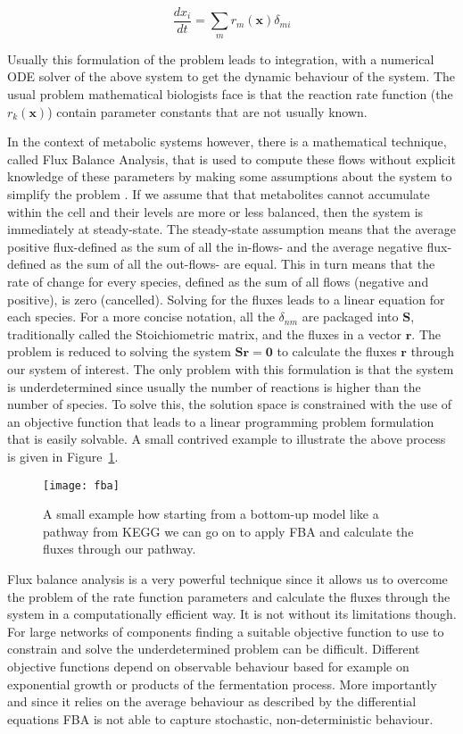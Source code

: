 \begin{equation*}
\frac{dx_i}{dt} = \sum_{m} r_m(\mathbf{x})\delta_{mi}
\end{equation*}

Usually this formulation of the problem leads to integration, with a
numerical ODE solver of the above system to get the dynamic behaviour
of the system. The usual problem mathematical biologists face is that
the reaction rate function (the $r_k(\mathbf{x})$) contain parameter
constants that are not usually known.

In the context of metabolic systems however, there is a mathematical technique, called Flux Balance
Analysis, that is used to compute these flows without explicit
knowledge of these parameters by making some assumptions about the
system to simplify the problem \cite [] {orth2010flux}. If we assume that that metabolites
cannot accumulate within the cell and their levels are more or less
balanced, then the system is immediately at steady-state. The steady-state assumption means that the average positive flux-defined as the sum of
all the in-flows- and the average negative flux-defined as the sum of
all the out-flows- are equal. This in turn means that the rate of
change for every species, defined as the sum of all flows (negative and
positive), is zero (cancelled). Solving for the fluxes leads to a linear equation for each
species. For a more concise notation, all the $\delta_{nm}$ are
packaged into $\mathbf{S}$, traditionally called the Stoichiometric
matrix, and the fluxes in a vector $\mathbf{r}$. The problem
is reduced to solving the system $\mathbf{Sr} = \mathbf{0}$ to calculate the
fluxes $\mathbf{r}$ through our system of interest. The only problem
with this formulation is that the system is
underdetermined since usually the number of reactions is higher than
the number of species. To solve this, the solution space is constrained
with the use of an objective function that leads to a linear
programming problem formulation that is easily solvable. A small
contrived example to illustrate the above process is given in
Figure~\ref{fig:fba}.

\begin{figure}[htbp!]
\centering
\texttt{[image: fba]}
\caption[Flux Balance analysis]{A small example how starting from a
  bottom-up model like a pathway from KEGG we can go on to apply FBA
  and calculate the fluxes through our pathway.}
\label{fig:fba}
\end{figure}

Flux balance analysis is a very powerful technique since it allows us
to overcome the problem of the rate function parameters and calculate the
fluxes through the system in a computationally efficient way. It is
not without its limitations though. For large networks of components
finding a suitable objective function to use to constrain and solve
the underdetermined problem can be difficult. Different objective
functions depend on observable behaviour based for example on
exponential growth or products of the fermentation process. More importantly and
since it relies on the average behaviour as described by the
differential equations FBA is not able to capture stochastic,
non-deterministic behaviour.

